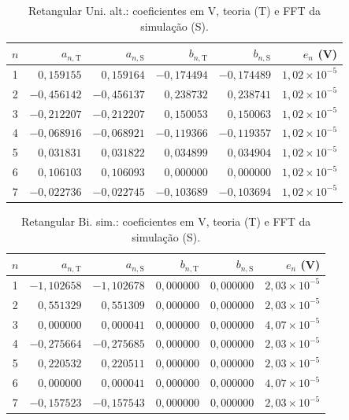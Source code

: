\begin{table}[H]
\centering
\footnotesize\setlength{\tabcolsep}{2pt}
\caption{Retangular Uni. alt.: coeficientes em V, teoria (T) e FFT da simulação (S).}\label{tab:coef_comp21}
\begin{tabular}{crrrrr}\hline
$n$ & $a_{n,\mathrm T}$ & $a_{n,\mathrm S}$ & $b_{n,\mathrm T}$ & $b_{n,\mathrm S}$ & $e_n$ (V) \\ \hline
1 & $0{,}159155$ & $0{,}159164$ & $-0{,}174494$ & $-0{,}174489$ & $1{,}02\!\times\!10^{-5}$ \\
2 & $-0{,}456142$ & $-0{,}456137$ & $0{,}238732$ & $0{,}238741$ & $1{,}02\!\times\!10^{-5}$ \\
3 & $-0{,}212207$ & $-0{,}212207$ & $0{,}150053$ & $0{,}150063$ & $1{,}02\!\times\!10^{-5}$ \\
4 & $-0{,}068916$ & $-0{,}068921$ & $-0{,}119366$ & $-0{,}119357$ & $1{,}02\!\times\!10^{-5}$ \\
5 & $0{,}031831$ & $0{,}031822$ & $0{,}034899$ & $0{,}034904$ & $1{,}02\!\times\!10^{-5}$ \\
6 & $0{,}106103$ & $0{,}106093$ & $0{,}000000$ & $0{,}000000$ & $1{,}02\!\times\!10^{-5}$ \\
7 & $-0{,}022736$ & $-0{,}022745$ & $-0{,}103689$ & $-0{,}103694$ & $1{,}02\!\times\!10^{-5}$ \\
\hline\end{tabular}
\end{table}
\begin{table}[H]
\centering
\footnotesize\setlength{\tabcolsep}{2pt}
\caption{Retangular Bi. sim.: coeficientes em V, teoria (T) e FFT da simulação (S).}\label{tab:coef_comp22}
\begin{tabular}{crrrrr}\hline
$n$ & $a_{n,\mathrm T}$ & $a_{n,\mathrm S}$ & $b_{n,\mathrm T}$ & $b_{n,\mathrm S}$ & $e_n$ (V) \\ \hline
1 & $-1{,}102658$ & $-1{,}102678$ & $0{,}000000$ & $0{,}000000$ & $2{,}03\!\times\!10^{-5}$ \\
2 & $0{,}551329$ & $0{,}551309$ & $0{,}000000$ & $0{,}000000$ & $2{,}03\!\times\!10^{-5}$ \\
3 & $0{,}000000$ & $0{,}000041$ & $0{,}000000$ & $0{,}000000$ & $4{,}07\!\times\!10^{-5}$ \\
4 & $-0{,}275664$ & $-0{,}275685$ & $0{,}000000$ & $0{,}000000$ & $2{,}03\!\times\!10^{-5}$ \\
5 & $0{,}220532$ & $0{,}220511$ & $0{,}000000$ & $0{,}000000$ & $2{,}03\!\times\!10^{-5}$ \\
6 & $0{,}000000$ & $0{,}000041$ & $0{,}000000$ & $0{,}000000$ & $4{,}07\!\times\!10^{-5}$ \\
7 & $-0{,}157523$ & $-0{,}157543$ & $0{,}000000$ & $0{,}000000$ & $2{,}03\!\times\!10^{-5}$ \\
\hline\end{tabular}
\end{table}
